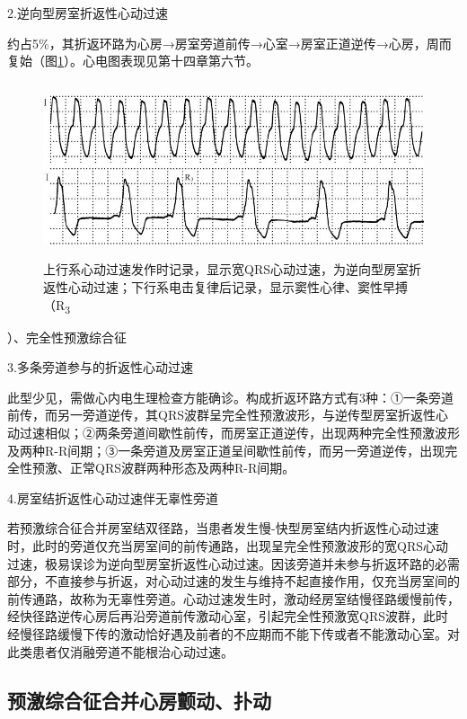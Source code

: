 2.逆向型房室折返性心动过速

约占5\%，其折返环路为心房→房室旁道前传→心室→房室正道逆传→心房，周而复始（图\ref{fig29-6}）。心电图表现见第十四章第六节。

\begin{figure}[!htbp]
 \centering
 \includegraphics[width=5.17708in,height=2.02083in]{./images/Image00490.jpg}
 \captionsetup{justification=centering}
 \caption{上行系心动过速发作时记录，显示宽QRS心动过速，为逆向型房室折返性心动过速；下行系电击复律后记录，显示窦性心律、窦性早搏（R\textsubscript{3}}
 \label{fig29-6}
  \end{figure} 
）、完全性预激综合征

3.多条旁道参与的折返性心动过速

此型少见，需做心内电生理检查方能确诊。构成折返环路方式有3种：①一条旁道前传，而另一旁道逆传，其QRS波群呈完全性预激波形，与逆传型房室折返性心动过速相似；②两条旁道间歇性前传，而房室正道逆传，出现两种完全性预激波形及两种R-R间期；③一条旁道及房室正道呈间歇性前传，而另一旁道逆传，出现完全性预激、正常QRS波群两种形态及两种R-R间期。

4.房室结折返性心动过速伴无辜性旁道

若预激综合征合并房室结双径路，当患者发生慢-快型房室结内折返性心动过速时，此时的旁道仅充当房室间的前传通路，出现呈完全性预激波形的宽QRS心动过速，极易误诊为逆向型房室折返性心动过速。因该旁道并未参与折返环路的必需部分，不直接参与折返，对心动过速的发生与维持不起直接作用，仅充当房室间的前传通路，故称为无辜性旁道。心动过速发生时，激动经房室结慢径路缓慢前传，经快径路逆传心房后再沿旁道前传激动心室，引起完全性预激宽QRS波群，此时经慢径路缓慢下传的激动恰好遇及前者的不应期而不能下传或者不能激动心室。对此类患者仅消融旁道不能根治心动过速。

\protect\hypertarget{text00036.htmlux5cux23subid424}{}{}

\subsection{预激综合征合并心房颤动、扑动}

